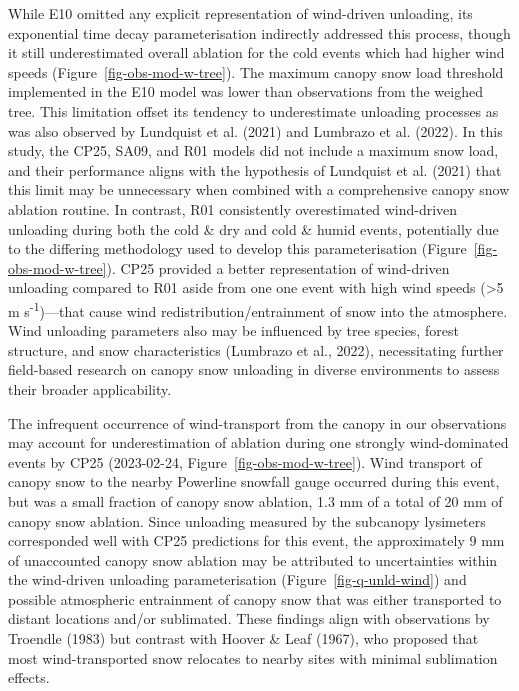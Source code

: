 \documentclass[
]{agujournal2019}
\begin{document}
While E10 omitted any explicit representation of wind-driven unloading,
its exponential time decay parameterisation indirectly addressed this
process, though it still underestimated overall ablation for the cold
events which had higher wind speeds (Figure~\ref{fig-obs-mod-w-tree}).
The maximum canopy snow load threshold implemented in the E10 model was
lower than observations from the weighed tree. This limitation offset
its tendency to underestimate unloading processes as was also observed
by Lundquist et al. (2021) and Lumbrazo et al. (2022). In this study,
the CP25, SA09, and R01 models did not include a maximum snow load, and
their performance aligns with the hypothesis of Lundquist et al. (2021)
that this limit may be unnecessary when combined with a comprehensive
canopy snow ablation routine. In contrast, R01 consistently
overestimated wind-driven unloading during both the cold \& dry and cold
\& humid events, potentially due to the differing methodology used to
develop this parameterisation (Figure~\ref{fig-obs-mod-w-tree}). CP25
provided a better representation of wind-driven unloading compared to
R01 aside from one one event with high wind speeds (\textgreater5 m
s\textsuperscript{-1})---that cause wind redistribution/entrainment of
snow into the atmosphere. Wind unloading parameters also may be
influenced by tree species, forest structure, and snow characteristics
(Lumbrazo et al., 2022), necessitating further field-based research on
canopy snow unloading in diverse environments to assess their broader
applicability.

The infrequent occurrence of wind-transport from the canopy in our
observations may account for underestimation of ablation during one
strongly wind-dominated events by CP25 (2023-02-24,
Figure~\ref{fig-obs-mod-w-tree}). Wind transport of canopy snow to the
nearby Powerline snowfall gauge occurred during this event, but was a
small fraction of canopy snow ablation, 1.3 mm of a total of 20 mm of
canopy snow ablation. Since unloading measured by the subcanopy
lysimeters corresponded well with CP25 predictions for this event, the
approximately 9 mm of unaccounted canopy snow ablation may be attributed
to uncertainties within the wind-driven unloading parameterisation
(Figure~\ref{fig-q-unld-wind}) and possible atmospheric entrainment of
canopy snow that was either transported to distant locations and/or
sublimated. These findings align with observations by Troendle (1983)
but contrast with Hoover \& Leaf (1967), who proposed that most
wind-transported snow relocates to nearby sites with minimal sublimation
effects.
\end{document}
